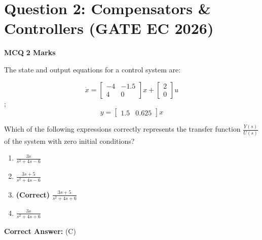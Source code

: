 \documentclass[11pt,a4paper]{article}
\begin{document}
\section*{Question 2: Compensators \& Controllers (GATE EC 2026)}
\noindent \textbf{\color{primary}MCQ} \hfill \textbf{\color{secondary}2 Marks}


\noindent The state and output equations for a control system are:

\[
\dot{x} = \begin{bmatrix} -4 & -1.5 \\ 4 & 0 \end{bmatrix} x + \begin{bmatrix} 2 \\ 0 \end{bmatrix} u
\]
; 
\[
y = \begin{bmatrix} 1.5 & 0.625 \end{bmatrix} x
\]

Which of the following expressions correctly represents the transfer function $\frac{Y(s)}{U(s)}$ of the system with zero initial conditions?


\begin{enumerate}[label=(\Alph*)]
    \item $\frac{3s}{s^2+4s-6}$
    \item $\frac{3s+5}{s^2+4s-6}$
    \item \textbf{(Correct)} $\frac{3s+5}{s^2+4s+6}$
    \item $\frac{3s}{s^2+4s+6}$
\end{enumerate}

\noindent \textbf{Correct Answer:} (C)
\end{document}
